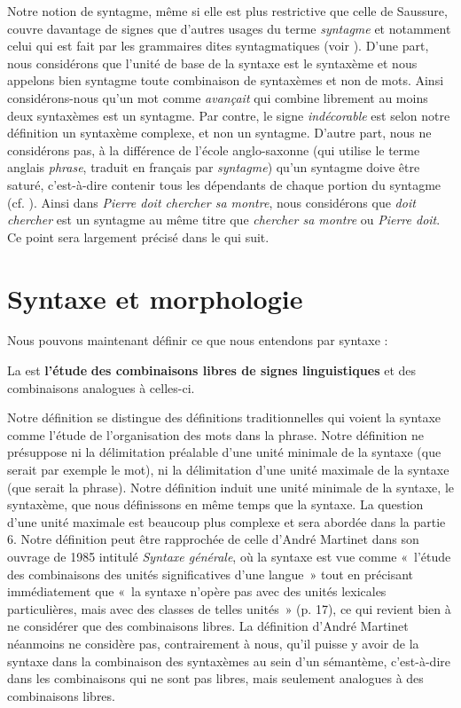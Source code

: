 {    Notre notion de syntagme, même si elle est plus restrictive que celle de Saussure, couvre davantage de signes que d’autres usages du terme \textit{syntagme} et notamment celui qui est fait par les grammaires dites syntagmatiques (voir ). D’une part, nous considérons que l’unité de base de la syntaxe est le syntaxème et nous appelons bien syntagme toute combinaison de syntaxèmes et non de mots. Ainsi considérons-nous qu’un mot comme \textit{avançait} qui combine librement au moins deux syntaxèmes est un syntagme. Par contre, le signe \textit{indécorable} est selon notre définition un syntaxème complexe, et non un syntagme. D’autre part, nous ne considérons pas, à la différence de l’école anglo-saxonne (qui utilise le terme anglais \textit{phrase}, traduit en français par \textit{syntagme}) qu’un syntagme doive être saturé, c’est-à-dire contenir tous les dépendants de chaque portion du syntagme (cf. ). Ainsi dans \textit{Pierre doit chercher sa montre}, nous considérons que \textit{doit chercher} est un syntagme au même titre que \textit{chercher sa montre} ou \textit{Pierre doit}. Ce point sera largement précisé dans le  qui suit.
}
\section{Syntaxe et morphologie}\label{sec:3.1.6}

Nous pouvons maintenant définir ce que nous entendons par syntaxe :

{La  est \textbf{l’étude} \textbf{des combinaisons libres de signes linguistiques} et des combinaisons analogues à celles-ci.}

Notre définition se distingue des définitions traditionnelles qui voient la syntaxe comme l’étude de l’organisation des mots dans la phrase. Notre définition ne présuppose ni la délimitation préalable d’une unité minimale de la syntaxe (que serait par exemple le mot), ni la délimitation d’une unité maximale de la syntaxe (que serait la phrase). Notre définition induit une unité minimale de la syntaxe, le syntaxème, que nous définissons en même temps que la syntaxe. La question d’une unité maximale est beaucoup plus complexe et sera abordée dans la partie 6. Notre définition peut être rapprochée de celle d’André Martinet dans son ouvrage de 1985 intitulé \textit{Syntaxe générale}, où la syntaxe est vue comme «~l’étude des combinaisons des unités significatives d’une langue~» tout en précisant immédiatement que «~la syntaxe n’opère pas avec des unités lexicales particulières, mais avec des classes de telles unités~» (p. 17), ce qui revient bien à ne considérer que des combinaisons libres. La définition d’André Martinet néanmoins ne considère pas, contrairement à nous, qu’il puisse y avoir de la syntaxe dans la combinaison des syntaxèmes au sein d’un sémantème, c’est-à-dire dans les combinaisons qui ne sont pas libres, mais seulement analogues à des combinaisons libres.

